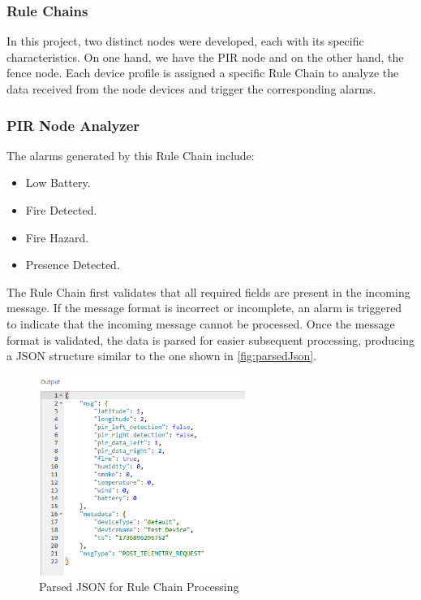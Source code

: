 \subsubsection*{Rule Chains}
In this project, two distinct nodes were developed, each with its specific characteristics. On one hand, we have the PIR node and on the other hand, the fence node. 
Each device profile is assigned a specific Rule Chain to analyze the data received from the node devices and trigger the corresponding alarms.


\subsubsection*{PIR Node Analyzer}
The alarms generated by this Rule Chain include:
\begin{itemize}
    \item Low Battery.
    \item Fire Detected.
    \item Fire Hazard.
    \item Presence Detected.
\end{itemize}

The Rule Chain first validates that all required fields are present in the incoming message. If the message format is incorrect or incomplete, an alarm is triggered 
to indicate that the incoming message cannot be processed. Once the message format is validated, the data is parsed for easier subsequent processing, producing a JSON
structure similar to the one shown in \autoref{fig:parsedJson}.

\begin{figure}[H]
    \centering
    \includegraphics[width=0.6\textwidth]{./images/8/jsonParsed.PNG}
    \caption{Parsed JSON for Rule Chain Processing}
    \label{fig:parsedJson}
\end{figure}

